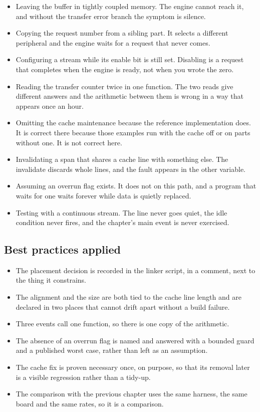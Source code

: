 \begin{itemize}
\item Leaving the buffer in tightly coupled memory. The engine cannot reach it,
and without the transfer error branch the symptom is silence.
\item Copying the request number from a sibling part. It selects a different
peripheral and the engine waits for a request that never comes.
\item Configuring a stream while its enable bit is still set. Disabling is a
request that completes when the engine is ready, not when you wrote the zero.
\item Reading the transfer counter twice in one function. The two reads give
different answers and the arithmetic between them is wrong in a way that appears
once an hour.
\item Omitting the cache maintenance because the reference implementation does.
It is correct there because those examples run with the cache off or on parts
without one. It is not correct here.
\item Invalidating a span that shares a cache line with something else. The
invalidate discards whole lines, and the fault appears in the other variable.
\item Assuming an overrun flag exists. It does not on this path, and a program
that waits for one waits forever while data is quietly replaced.
\item Testing with a continuous stream. The line never goes quiet, the idle
condition never fires, and the chapter's main event is never exercised.
\end{itemize}

\subsection*{Best practices applied}

\begin{itemize}
\item The placement decision is recorded in the linker script, in a comment,
next to the thing it constrains.
\item The alignment and the size are both tied to the cache line length and are
declared in two places that cannot drift apart without a build failure.
\item Three events call one function, so there is one copy of the arithmetic.
\item The absence of an overrun flag is named and answered with a bounded guard
and a published worst case, rather than left as an assumption.
\item The cache fix is proven necessary once, on purpose, so that its removal
later is a visible regression rather than a tidy-up.
\item The comparison with the previous chapter uses the same harness, the same
board and the same rates, so it is a comparison.
\end{itemize}

